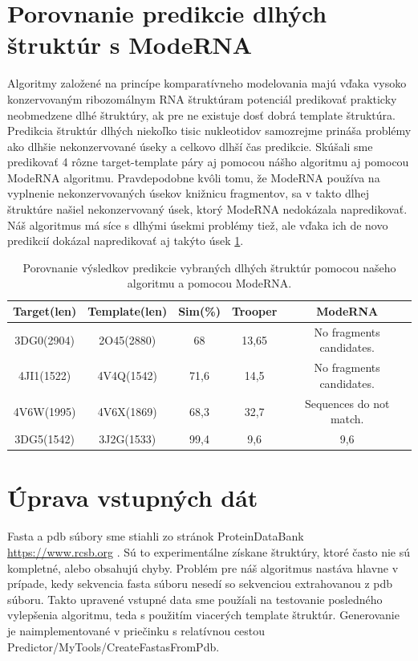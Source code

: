 \section{Porovnanie predikcie dlhých štruktúr s ModeRNA}
Algoritmy založené na princípe komparatívneho modelovania majú vďaka vysoko konzervovaným ribozomálnym RNA štruktúram potenciál predikovať prakticky neobmedzene dlhé štruktúry, ak pre ne existuje dosť dobrá template štruktúra. Predikcia štruktúr dlhých niekoľko tisic nukleotidov samozrejme prináša problémy ako dlhšie nekonzervované úseky a celkovo dlhší čas predikcie. Skúšali sme predikovať 4 rôzne target-template páry aj pomocou nášho algoritmu aj pomocou ModeRNA algoritmu. Pravdepodobne kvôli tomu, že ModeRNA používa na vyplnenie nekonzervovaných úsekov knižnicu fragmentov, sa v takto dlhej štruktúre našiel nekonzervovaný úsek, ktorý ModeRNA nedokázala napredikovať. Náš algoritmus má síce s dlhými úsekmi problémy tiež, ale vďaka ich de novo predikcií dokázal napredikovať aj takýto úsek \ref{tab4.3}.

\begin{table}[b!]
\centering
\begin{tabular}{ccccc}
\toprule
Target(len) & Template(len) & Sim(\%) & Trooper & ModeRNA\\
\midrule
3DG0(2904)  & 2O45(2880) & 68  & 13,65 & No fragments candidates.\\
4JI1(1522)  & 4V4Q(1542) & 71,6  & 14,5 &  No fragments candidates.\\
4V6W(1995)  &  4V6X(1869) & 68,3  & 32,7 & Sequences do not match.\\
3DG5(1542)  & 3J2G(1533) &  99,4  & 9,6 & 9,6\\
\bottomrule
\end{tabular}
\caption{Porovnanie výsledkov predikcie vybraných dlhých štruktúr pomocou našeho algoritmu a pomocou ModeRNA. }\label{tab4.3}
\end{table}


\section{Úprava vstupných dát}
Fasta a pdb súbory sme stiahli zo stránok ProteinDataBank \url{https://www.rcsb.org} \cite{PDB00}. Sú to experimentálne získane štruktúry, ktoré často nie sú kompletné, alebo obsahujú chyby. Problém pre náš algoritmus nastáva hlavne v prípade, kedy sekvencia fasta súboru nesedí so sekvenciou extrahovanou z pdb súboru. Takto upravené vstupné data sme použíali na testovanie posledného vylepšenia algoritmu, teda s použitím viacerých template štruktúr. Generovanie je naimplementované v priečinku s relatívnou cestou Predictor/MyTools/CreateFastasFromPdb.


